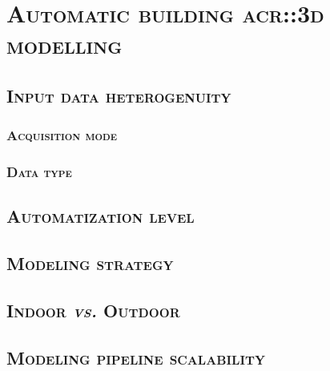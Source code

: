 \minitoc

\vfill

\clearpage

\section{\textsc{Automatic building \texorpdfstring{\gls*{acr::3d}}{3D} modelling}}
    \label{sec::state_of_the_art::building_modeling}

    \subsection{\textsc{Input data heterogenuity}}
        \label{subsec::state_of_the_art::building_modeling::input}
        \subsubsection{\textsc{Acquisition mode}}

        \subsubsection{\textsc{Data type}}

    \subsection{\textsc{Automatization level}}
        \label{subsec::state_of_the_art::building_modeling::automatization}

    \subsection{\textsc{Modeling strategy}}
        \label{subsec::state_of_the_art::building_modeling::strategy}

    \subsection{\textsc{Indoor \textit{vs.} Outdoor}}
        \label{subsec::state_of_the_art::building_modeling::in_out_door}

    \subsection{\textsc{Modeling pipeline scalability}}
        \label{subsec::state_of_the_art::building_modeling::scalability}

    \clearpage
